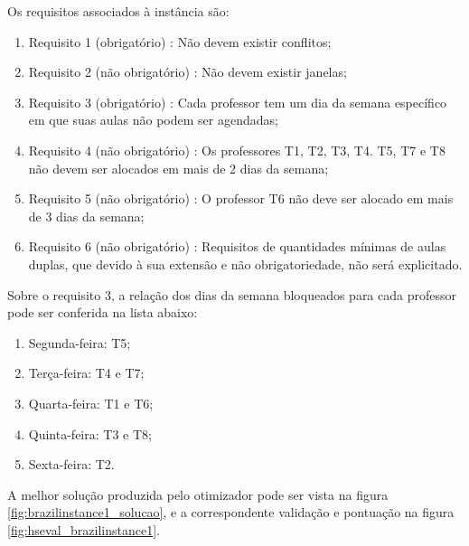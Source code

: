 

Os requisitos associados à instância são:
\begin{enumerate}
	\item Requisito 1 (obrigatório) : Não devem existir conflitos;
	\item Requisito 2 (não obrigatório) : Não devem existir janelas;
	\item Requisito 3 (obrigatório) : Cada professor tem um dia da semana específico em que suas aulas não podem ser agendadas;
	\item Requisito 4 (não obrigatório) : Os professores T1, T2, T3, T4. T5, T7 e T8 não devem ser alocados em mais de 2 dias da semana;
	\item Requisito 5 (não obrigatório) : O professor T6 não deve ser alocado em mais de 3 dias da semana;
	\item Requisito 6 (não obrigatório) : Requisitos de quantidades mínimas de aulas duplas, que devido à sua extensão e não obrigatoriedade, não será explicitado.
\end{enumerate}

Sobre o requisito 3, a relação dos dias da semana bloqueados para cada professor pode ser conferida na lista abaixo:
\begin{enumerate}
	\item Segunda-feira: T5;
	\item Terça-feira: T4 e T7;
	\item Quarta-feira: T1 e T6;
	\item Quinta-feira: T3 e T8;
	\item Sexta-feira: T2.
\end{enumerate}

A melhor solução produzida pelo otimizador pode ser vista na figura \ref{fig:brazilinstance1_solucao}, e a correspondente validação e pontuação na figura \ref{fig:hseval_brazilinstance1}.

